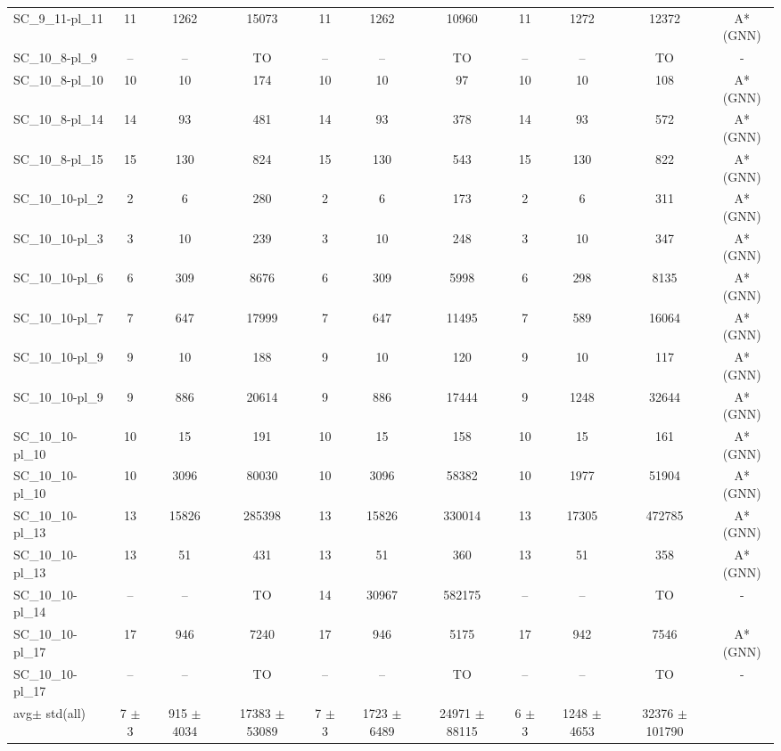 \documentclass{article}
\newcommand{\unsolvedColumn}{--}
\newcommand{\myTO}{TO}
\newcommand{\myAvg}{avg}
\newcommand{\myStd}{std}
\newcommand{\allInstances}{all}
\begin{document}
\begin{longtable}[!ht]{l|ccc|ccc|cccc}
SC\_9\_11-pl\_11 & 11 & 1262 & 15073 & 11 & 1262 & 10960 & 11 & 1272 & 12372 & A*(GNN) \\
SC\_10\_8-pl\_9 & \unsolvedColumn & \unsolvedColumn & \myTO & \unsolvedColumn & \unsolvedColumn & \myTO & \unsolvedColumn & \unsolvedColumn & \myTO & - \\
SC\_10\_8-pl\_10 & 10 & 10 & 174 & 10 & 10 & 97 & 10 & 10 & 108 & A*(GNN) \\
SC\_10\_8-pl\_14 & 14 & 93 & 481 & 14 & 93 & 378 & 14 & 93 & 572 & A*(GNN) \\
SC\_10\_8-pl\_15 & 15 & 130 & 824 & 15 & 130 & 543 & 15 & 130 & 822 & A*(GNN) \\
SC\_10\_10-pl\_2 & 2 & 6 & 280 & 2 & 6 & 173 & 2 & 6 & 311 & A*(GNN) \\
SC\_10\_10-pl\_3 & 3 & 10 & 239 & 3 & 10 & 248 & 3 & 10 & 347 & A*(GNN) \\
SC\_10\_10-pl\_6 & 6 & 309 & 8676 & 6 & 309 & 5998 & 6 & 298 & 8135 & A*(GNN) \\
SC\_10\_10-pl\_7 & 7 & 647 & 17999 & 7 & 647 & 11495 & 7 & 589 & 16064 & A*(GNN) \\
SC\_10\_10-pl\_9 & 9 & 10 & 188 & 9 & 10 & 120 & 9 & 10 & 117 & A*(GNN) \\
SC\_10\_10-pl\_9 & 9 & 886 & 20614 & 9 & 886 & 17444 & 9 & 1248 & 32644 & A*(GNN) \\
SC\_10\_10-pl\_10 & 10 & 15 & 191 & 10 & 15 & 158 & 10 & 15 & 161 & A*(GNN) \\
SC\_10\_10-pl\_10 & 10 & 3096 & 80030 & 10 & 3096 & 58382 & 10 & 1977 & 51904 & A*(GNN) \\
SC\_10\_10-pl\_13 & 13 & 15826 & 285398 & 13 & 15826 & 330014 & 13 & 17305 & 472785 & A*(GNN) \\
SC\_10\_10-pl\_13 & 13 & 51 & 431 & 13 & 51 & 360 & 13 & 51 & 358 & A*(GNN) \\
SC\_10\_10-pl\_14 & \unsolvedColumn & \unsolvedColumn & \myTO & 14 & 30967 & 582175 & \unsolvedColumn & \unsolvedColumn & \myTO & - \\
SC\_10\_10-pl\_17 & 17 & 946 & 7240 & 17 & 946 & 5175 & 17 & 942 & 7546 & A*(GNN) \\
SC\_10\_10-pl\_17 & \unsolvedColumn & \unsolvedColumn & \myTO & \unsolvedColumn & \unsolvedColumn & \myTO & \unsolvedColumn & \unsolvedColumn & \myTO & - \\
\hline
\myAvg  $\pm$ \myStd \hfill (\allInstances) & 7 $\pm$ 3 & 915 $\pm$ 4034 & 17383 $\pm$ 53089 & 7 $\pm$ 3 & 1723 $\pm$ 6489 & 24971 $\pm$ 88115 & 6 $\pm$ 3 & 1248 $\pm$ 4653 & 32376 $\pm$ 101790 &  \\

\end{longtable}
\end{document}
